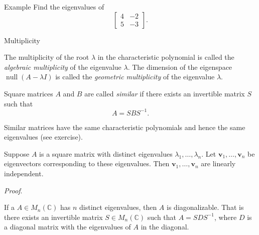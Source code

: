 \documentclass [aspectratio=169]{beamer}
\newcommand{\bv}{{\mathbf{v}}}
\newcommand{\C}{{\mathbb{C}}}
\newcommand{\inv}{{-1}}
\DeclareMathOperator{\nullspace}{null}
\begin{document}
\begin{frame}{Example}
Find the eigenvalues of
$$ \begin{bmatrix} 4 & -2 \\ 5 & -3 \end{bmatrix}.$$
\vspace{4cm}

\end{frame}


\begin{frame}{Multiplicity}
\begin{definition}
The multiplicity of the root $\lambda$ in the characteristic polynomial is called the \emph{algebraic multiplicity} of the eigenvalue $\lambda$. The dimension of the eigenspace $\nullspace (A - \lambda I)$ is called the \emph{geometric multiplicity} of the eigenvalue $\lambda$.
\end{definition}

\end{frame}


\begin{frame}
\begin{definition}
Square matrices $A$ and $B$ are called \emph{similar} if there exists an invertible matrix $S$ such that
$$A = SBS^\inv.$$
\end{definition}

\vspace{1em}

Similar matrices have the same characteristic polynomials and hence the same eigenvalues (see exercise).
\end{frame}


\begin{frame}
\begin{theorem}
Suppose $A$ is a square matrix with distinct eigenvalues $\lambda_1, \ldots, \lambda_n$. Let $\bv_1, \ldots, \bv_n$ be eigenvectors corresponding to these eigenvalues. Then $\bv_1, \ldots, \bv_n$ are linearly independent.
\end{theorem}
\textit{Proof}.
\vspace{4cm}

\end{frame}

\begin{frame}

\end{frame}


\begin{frame}
\begin{corollary}
If a $A\in M_n(\C)$ has $n$ distinct eigenvalues, then $A$ is diagonalizable. That is there exists an invertible matrix $S\in M_n(\C)$ such that $A = SDS^\inv$, where $D$ is a diagonal matrix with the eigenvalues of $A$ in the diagonal.
\end{corollary}

\end{frame}
\end{document}
